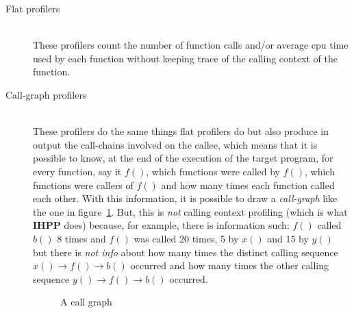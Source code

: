 \documentclass[a4paper,10pt]{report}
\begin{document}
\begin{description}
\item[Flat profilers] \hfill \\
These profilers count the number of function calls and/or average cpu time used
by each function without keeping trace of the calling context of the function.
\item[Call-graph profilers] \hfill \\
These profilers do the same things flat profilers do but also produce in output
the call-chains involved on the callee, which means that it is possible to know,
at the end of the execution of the target program, for every function, say it
$f()$, which functions were called by $f()$, which functions were
callers of $f()$ and how many times each function called each other. With this
information, it is possible to draw a
\emph{call-graph} like the one in figure~\ref{callgraph1}. But, this is
\emph{not} calling context profiling (which is what \textbf{IHPP} does) because,
for example, there is information such: $f()$ called $b()$ 8 times and $f()$ was called 20
times, 5 by $x()$ and 15 by $y()$ but there is \emph{not info} about how many times the
distinct calling sequence $x()\rightarrow f()\rightarrow b()$ occurred and how
many times the other calling sequence $y()\rightarrow f()\rightarrow b()$
occurred.

\begin{figure}

\begin{center}


\end{center}

\caption{A call graph}
\label{callgraph1}

\end{figure}



\end{description}
\end{document}
